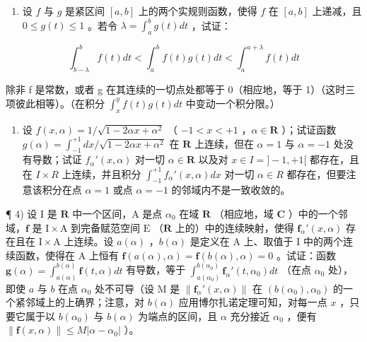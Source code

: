 \begin{enumerate}
\def\labelenumi{\arabic{enumi})}
\setcounter{enumi}{1}
\tightlist
\item
  设 \(f\) 与 \(g\) 是紧区间 \([a, b]\) 上的两个实规则函数，使得 \(f\) 在 \([a, b]\) 上递减，且 \(0 \leqslant g(t) \leqslant 1\) 。若令 \(\lambda = \int_{a}^{b} g(t) dt\) ，试证：
\end{enumerate}

\[
\int_ {b - \lambda} ^ {b} f (t) d t <   \int_ {a} ^ {b} f (t) g (t) d t <   \int_ {a} ^ {a + \lambda} f (t) d t
\]

除非 f 是常数，或者 g 在其连续的一切点处都等于 0（相应地，等于 1）（这时三项彼此相等）。（在积分 \(\int_{x}^{y} f(t)g(t)dt\) 中变动一个积分限。）

\begin{enumerate}
\def\labelenumi{\arabic{enumi})}
\setcounter{enumi}{2}
\tightlist
\item
  设 \(f(x, \alpha) = 1 / \sqrt{1 - 2\alpha x + \alpha^2}\) （ \(-1 < x < +1\) ，\(\alpha \in \mathbf{R}\) ）；试证函数 \(g(\alpha) = \int_{-1}^{+1} dx / \sqrt{1 - 2\alpha x + \alpha^2}\) 在 \(\mathbf{R}\) 上连续，但在 \(\alpha = 1\) 与 \(\alpha = -1\) 处没有导数；试证 \(f_{\alpha}'(x, \alpha)\) 对一切 \(\alpha \in \mathbf{R}\) 以及对 \(x \in I = ] - 1, +1[\) 都存在，且在 \(I \times R\) 上连续，并且积分 \(\int_{-1}^{+1} f_{\alpha}'(x, \alpha) dx\) 对一切 \(\alpha \in R\) 都存在，但要注意该积分在点 \(\alpha = 1\) 或点 \(\alpha = -1\) 的邻域内不是一致收敛的。
\end{enumerate}

¶ 4) 设 I 是 \(\mathbf{R}\) 中一个区间，A 是点 \(\alpha_0\) 在域 \(\mathbf{R}\) （相应地，域 \(\mathbf{C}\) ）中的一个邻域，\(\mathbf{f}\) 是 \(\mathrm{I} \times \mathrm{A}\) 到完备赋范空间 \(\mathrm{E}\) （\(\mathbf{R}\) 上的）中的连续映射，使得 \(\mathbf{f}_{\alpha}'(x, \alpha)\) 存在且在 \(\mathrm{I} \times \mathrm{A}\) 上连续。设 \(a(\alpha)\) ，\(b(\alpha)\) 是定义在 A 上、取值于 I 中的两个连续函数，使得在 A 上恒有 \(\mathbf{f}(a(\alpha), \alpha) = \mathbf{f}(b(\alpha), \alpha) = 0\) 。试证：函数 \(\mathbf{g}(\alpha) = \int_{a(\alpha)}^{b(\alpha)} \mathbf{f}(t, \alpha) dt\) 有导数，等于 \(\int_{a(\alpha_0)}^{b(\alpha_0)} \mathbf{f}_{\alpha}'(t, \alpha_0) dt\) （在点 \(\alpha_0\) 处），即使 \(a\) 与 \(b\) 在点 \(\alpha_0\) 处不可导（设 M 是 \(\left\| \mathbf{f}_{\alpha}'(x, \alpha) \right\|\) 在 \((b(\alpha_0), \alpha_0)\) 的一个紧邻域上的上确界；注意，对 \(b(\alpha)\) 应用博尔扎诺定理可知，对每一点 \(x\) ，只要它属于以 \(b(\alpha_0)\) 与 \(b(\alpha)\) 为端点的区间，且 \(\alpha\) 充分接近 \(\alpha_0\) ，便有 \(\| \mathbf{f}(x, \alpha) \| \leqslant M |\alpha - \alpha_0|\) ）。

